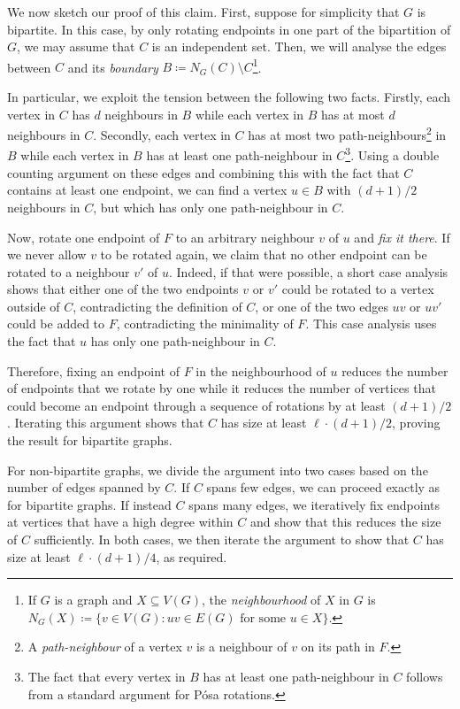 \documentclass[11pt]{article}
\theoremstyle{plain}
\theoremstyle{definition}
\begin{document}
We now sketch our proof of this claim. First, suppose for simplicity that $G$ is bipartite. In this case, by only rotating endpoints in one part of the bipartition of $G$, we may assume that $C$ is an independent set. Then, we will analyse the edges between $C$ and its \emph{boundary} $B \coloneqq N_G(C) \setminus C$\footnote{If $G$ is a graph and $X \subseteq V(G)$, the \emph{neighbourhood} of $X$ in $G$ is $N_G(X) \coloneqq \{v \in V(G) : u v \in E(G) \text{ for some } u \in X\}$.}.

In particular, we exploit the tension between the following two facts. Firstly, each vertex in $C$ has $d$ neighbours in $B$ while each vertex in $B$ has at most $d$ neighbours in $C$. Secondly, each vertex in $C$ has at most two path-neighbours\footnote{A \emph{path-neighbour} of a vertex $v$ is a neighbour of $v$ on its path in $F$.} in $B$ while each vertex in $B$ has at least one path-neighbour in $C$\footnote{The fact that every vertex in $B$ has at least one path-neighbour in $C$ follows from a standard argument for P\'{o}sa rotations.}. Using a double counting argument on these edges and combining this with the fact that $C$ contains at least one endpoint, we can find a vertex $u \in B$ with $(d+1)/2$ neighbours in $C$, but which has only one path-neighbour in $C$.

Now, rotate one endpoint of $F$ to an arbitrary neighbour $v$ of $u$ and \emph{fix it there}. If we never allow $v$ to be rotated again, we claim that no other endpoint can be rotated to a neighbour $v'$ of $u$. Indeed, if that were possible, a short case analysis shows that either one of the two endpoints $v$ or $v'$ could be rotated to a vertex outside of $C$, contradicting the definition of $C$, or one of the two edges $u v$ or $u v'$ could be added to $F$, contradicting the minimality of $F$. This case analysis uses the fact that $u$ has only one path-neighbour in $C$.

Therefore, fixing an endpoint of $F$ in the neighbourhood of $u$ reduces the number of endpoints that we rotate by one while it reduces the number of vertices that could become an endpoint through a sequence of rotations by at least $(d+1)/2$. Iterating this argument shows that $C$ has size at least $\ell \cdot (d+1)/2$, proving the result for bipartite graphs.

For non-bipartite graphs, we divide the argument into two cases based on the number of edges spanned by $C$. If $C$ spans few edges, we can proceed exactly as for bipartite graphs. If instead $C$ spans many edges, we iteratively fix endpoints at vertices that have a high degree within $C$ and show that this reduces the size of $C$ sufficiently. In both cases, we then iterate the argument to show that $C$ has size at least $\ell \cdot (d+1)/4$, as required.
\end{document}
